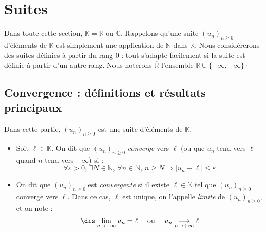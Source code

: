 \documentclass[a4paper,10pt]{report}
\begin{document}


\section{Suites}

\noindent Dans toute cette section, $\mathbb{K}= \mathbb{R}$ ou $\mathbb{C}$. Rappelons qu'une suite $(u_n)_{n \geq 0}$ d'éléments de $\mathbb{K}$ est simplement une application de $\mathbb{N}$ dans $\mathbb{K}$. Nous considérerons des suites définies à partir du rang $0$ : tout s'adapte facilement si la suite est définie à partir d'un autre rang. Nous noterons $\overline{\mathbb{R}}$ l'ensemble $\mathbb{R} \cup \lbrace - \infty, + \infty \rbrace\cdot$

\subsection{Convergence : définitions et résultats principaux}

\noindent Dans cette partie, $(u_n)_{ n \geq 0}$ est une suite d'éléments de $\mathbb{K}$.

\begin{defip} 
\begin{itemize}
\item Soit $\ell \in \mathbb{K}$. On dit que $(u_n)_{n \geq 0}$ \textit{converge} vers $\ell$ (ou que $u_n$ tend vers $\ell$ quand $n$ tend vers $+ \infty$) si :
$$ \forall \varepsilon>0, \, \exists N \in \mathbb{N}, \, \forall n \in \mathbb{N}, \, n \geq N \Rightarrow \vert u_n - \ell \vert \leq \varepsilon$$ 
\item On dit que $(u_n)_{n \geq 0}$ est \textit{convergente} si il existe $\ell \in \mathbb{K}$ tel que $(u_n)_{n \geq 0}$ converge vers $\ell$. Dans ce cas, $\ell$ est unique, on l'appelle \textit{limite} de $(u_n)_{n \geq 0}$, et on note :
$$ \dis \lim_{ n \rightarrow + \infty} u_n = \ell \quad \hbox{ ou } \quad u_n \underset{n \rightarrow + \infty}{\longrightarrow} \ell$$
\end{itemize}
\end{defip}
\end{document}
